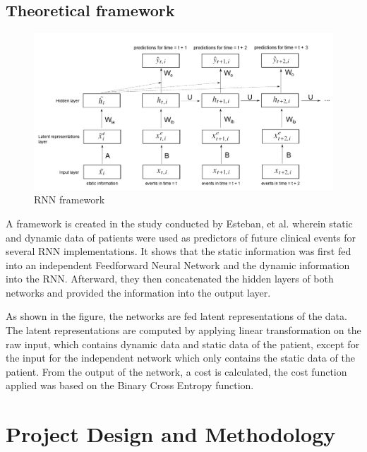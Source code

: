 \documentclass[10pt,11pt,12pt,oneside]{book}
\begin{document}
    \section{Theoretical framework}
    \begin{figure} [ht]
        \includegraphics[width=6.5in]{rnnframework.png}
        \caption{RNN framework}
        \medskip
    \end{figure}
    A framework is created in the study conducted by Esteban, et al. wherein static and dynamic data of patients were used as predictors of future clinical events for several RNN implementations. It shows that the static information was first fed into an independent Feedforward Neural Network and the dynamic information into the RNN. Afterward, they then concatenated the hidden layers of both networks and provided the information into the output layer.

    As shown in the figure, the networks are fed latent representations of the data. The latent representations are computed by applying linear transformation on the raw input, which contains dynamic data and static data of the patient, except for the input for the independent network which only contains the static data of the patient. From the output of the network, a cost is calculated, the cost function applied was based on the Binary Cross Entropy function. \cite{DBLP:journals/corr/EstebanSYT16}
    \FloatBarrier
\chapter{Project Design and Methodology}
\end{document}
